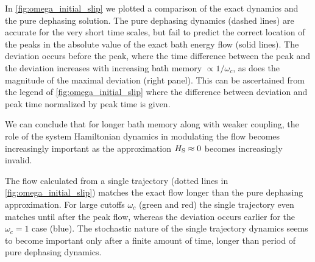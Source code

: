 In \cref{fig:omega_initial_slip} we plotted a comparison of the exact
dynamics and the pure dephasing solution. The pure dephasing dynamics
(dashed lines) are accurate for the very short time scales, but fail
to predict the correct location of the peaks in the absolute value of
the exact bath energy flow (solid lines).  The deviation occurs before
the peak, where the time difference between the peak and the deviation
increases with increasing bath memory \(\propto 1/ω_c\), as does the
magnitude of the maximal deviation (right panel). This can be
ascertained from the legend of \cref{fig:omega_initial_slip} where the
difference between deviation and peak time normalized by peak time is
given.

We can conclude that for longer bath memory along with weaker
coupling, the role of the system Hamiltonian dynamics in modulating
the flow becomes increasingly important as the approximation
\(H_{\mathrm{S}}\approx 0\) becomes increasingly invalid.

The flow calculated from a single trajectory (dotted lines in
\cref{fig:omega_initial_slip}) matches the exact flow longer than
the pure dephasing approximation. For large cutoffs \(ω_{c}\) (green
and red) the single trajectory even matches until after the peak flow,
whereas the deviation occurs earlier for the \(ω_{c}=1\) case
(blue). The stochastic nature of the single trajectory dynamics seems
to become important only after a finite amount of time, longer than
period of pure dephasing dynamics.

